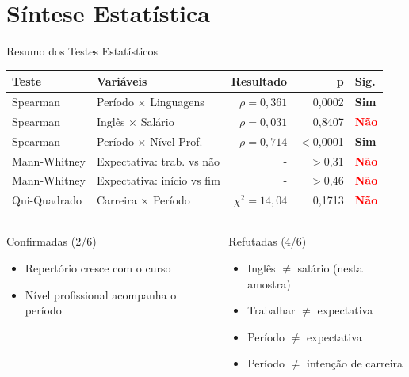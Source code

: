 \documentclass[fleqn]{beamer}
\begin{document}
\section{Síntese Estatística}

\begin{frame}{Resumo dos Testes Estatísticos}
\scriptsize
\begin{table}[H]
\centering
\begin{tabular}{llrrl}
\toprule
\textbf{Teste} & \textbf{Variáveis} & \textbf{Resultado} & \textbf{p} & \textbf{Sig.} \\
\midrule
Spearman & Período $\times$ Linguagens & $\rho = 0,361$ & 0,0002 & \textcolor{green!60!black}{\textbf{Sim}} \\
Spearman & Inglês $\times$ Salário & $\rho = 0,031$ & 0,8407 & \textcolor{red}{\textbf{Não}} \\
Spearman & Período $\times$ Nível Prof. & $\rho = 0,714$ & $<$0,0001 & \textcolor{green!60!black}{\textbf{Sim}} \\
Mann-Whitney & Expectativa: trab. vs não & - & $>$0,31 & \textcolor{red}{\textbf{Não}} \\
Mann-Whitney & Expectativa: início vs fim & - & $>$0,46 & \textcolor{red}{\textbf{Não}} \\
Qui-Quadrado & Carreira $\times$ Período & $\chi^2=14,04$ & 0,1713 & \textcolor{red}{\textbf{Não}} \\
\bottomrule
\end{tabular}
\end{table}

\normalsize
\begin{columns}[T]
\begin{exampleblock}{Confirmadas (2/6)}
\begin{itemize}
    \item Repertório cresce com o curso
    \item Nível profissional acompanha o período
\end{itemize}
\end{exampleblock}

\begin{alertblock}{Refutadas (4/6)}
\begin{itemize}
    \item Inglês $\neq$ salário (nesta amostra)
    \item Trabalhar $\neq$ expectativa
    \item Período $\neq$ expectativa
    \item Período $\neq$ intenção de carreira
\end{itemize}
\end{alertblock}
\end{columns}
\end{frame}
\end{document}
